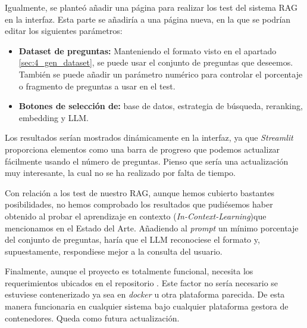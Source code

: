 		\noindent Igualmente, se planteó añadir una página para realizar los test del sistema RAG en la interfaz. Esta parte se añadiría a una página nueva, en la que se podrían editar los siguientes parámetros:
		
		\begin{itemize}
			\item \textbf{Dataset de preguntas:} Manteniendo el formato visto en el apartado \ref{sec:4_gen_dataset}, se puede usar el conjunto de preguntas que deseemos. También se puede añadir un parámetro numérico para controlar el porcentaje o fragmento de preguntas a usar en el test.
			\item \textbf{Botones de selección de:} base de datos, estrategia de búsqueda, reranking, embedding y LLM.
		\end{itemize}
		
		\noindent Los resultados serían mostrados dinámicamente en la interfaz, ya que \textit{Streamlit} proporciona elementos como una barra de progreso que podemos actualizar fácilmente usando el número de preguntas. Pienso que sería una actualización muy interesante, la cual no se ha realizado por falta de tiempo.
		
		\noindent Con relación a los test de nuestro RAG, aunque hemos cubierto bastantes posibilidades, no hemos comprobado los resultados que pudiésemos haber obtenido al probar el aprendizaje en contexto (\textit{In-Context-Learning})que mencionamos en el Estado del Arte. Añadiendo al \textit{prompt} un mínimo porcentaje del conjunto de preguntas, haría que el LLM reconociese el formato y, supuestamente, respondiese mejor a la consulta del usuario.
		
		\noindent Finalmente, aunque el proyecto es totalmente funcional, necesita los requerimientos ubicados en el repositorio \cite{0045_repo}. Este factor no sería necesario se estuviese contenerizado ya sea en \textit{docker} u otra plataforma parecida. De esta manera funcionaria en cualquier sistema bajo cualquier plataforma gestora de contenedores. Queda como futura actualización.   

\endgroup